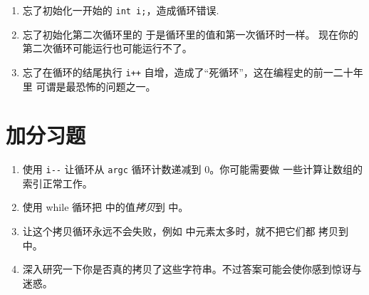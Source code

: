 \begin{enumerate}
\item 忘了初始化一开始的 \verb|int i;|，造成循环错误.
\item 忘了初始化第二次循环里的  于是循环里的值和第一次循环时一样。
现在你的第二次循环可能运行也可能运行不了。
\item 忘了在循环的结尾执行 \verb|i++| 自增，造成了“死循环”，这在编程史的前一二十年里
可谓是最恐怖的问题之一。
\end{enumerate}

\section{加分习题}

\begin{enumerate}
\item 使用 \verb|i--| 让循环从 \verb|argc| 循环计数递减到 0。你可能需要做
一些计算让数组的索引正常工作。
\item 使用 while 循环把  中的值\emph{拷贝}到  中。
\item 让这个拷贝循环永远不会失败，例如  中元素太多时，就不把它们都
拷贝到  中。
\item 深入研究一下你是否真的拷贝了这些字符串。不过答案可能会使你感到惊讶与迷惑。
\end{enumerate}



